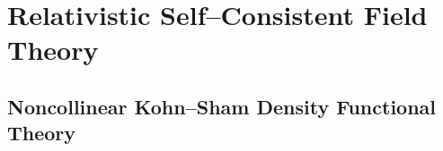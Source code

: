 \chapter{Relativistic Self--Consistent Field Theory}

\section{Noncollinear Kohn--Sham Density Functional Theory}
